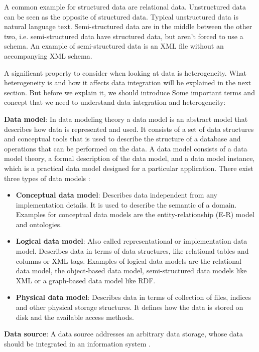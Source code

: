 A common example for structured data are relational data. Unstructured data can be seen as the opposite of structured data. Typical unstructured data is natural language text. Semi-structured data are in the middle between the other two, i.e. semi-structured data have structured data, but aren't forced to use a schema. An example of semi-structured data is an XML file without an accompanying XML schema.

A significant property to consider when looking at data is heterogeneity. What heterogeneity is and how it affects data integration will be explained in the next section. But before we explain it, we should introduce Some important terms and concept that we need to understand data integration and heterogeneity:

\textbf{Data model}: \label{data_model_index} In data modeling theory a data model is an abstract model that describes how data is represented and used. It consists of a set of data structures and conceptual tools that is used to describe the structure of a database and operations that can be performed on the data. A data model consists of a data model theory, a formal description of the data model, and a data model instance, which is a practical data model designed for a particular application. There exist three types of data models \cite[p.10-14]{IntroductionToDatabaseSystems2010}:
\begin{itemize}
	\item \textbf{Conceptual data model}: Describes data independent from any implementation details. It is used to describe the semantic of a domain. Examples for conceptual data models are the entity-relationship (E-R) model and ontologies. 
	\item \textbf{Logical data model}: Also called representational or implementation data model. Describes data in terms of data structures, like relational tables and columns or XML tags. Examples of logical data models are the relational data model, the object-based data model, semi-structured data models like XML or a graph-based data model like RDF. 
	\item \textbf{Physical data model}: Describes data in terms of collection of files, indices and other physical storage structures. It defines how the data is stored on disk and the available access methods. 
\end{itemize}

\textbf{Data source}:\label{data_source_index} A data source addresses an arbitrary data storage, whose data should be integrated in an information system \cite[p. 7]{DBLP:books/dp/LeserN2006}.

